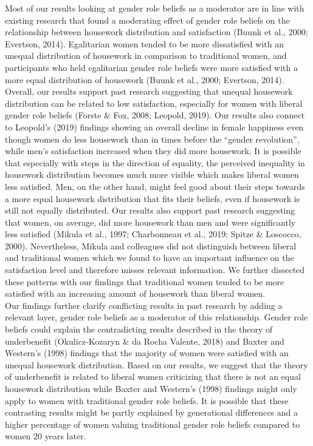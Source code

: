 \documentclass[
  man,floatsintext]{apa6}
\begin{document}
Most of our results looking at gender role beliefs as a moderator are in line with existing research that found a moderating effect of gender role beliefs on the relationship between housework distribution and satisfaction (Buunk et al., 2000; Evertson, 2014). Egalitarian women tended to be more dissatisfied with an unequal distribution of housework in comparison to traditional women, and participants who held egalitarian gender role beliefs were more satisfied with a more equal distribution of housework (Buunk et al., 2000; Evertson, 2014). Overall, our results support past research suggesting that unequal housework distribution can be related to low satisfaction, especially for women with liberal gender role beliefs (Forste \& Fox, 2008; Leopold, 2019). Our results also connect to Leopold's (2019) findings showing an overall decline in female happiness even though women do less housework than in times before the ``gender revolution'', while men's satisfaction increased when they did more housework. It is possible that especially with steps in the direction of equality, the perceived inequality in housework distribution becomes much more visible which makes liberal women less satisfied. Men, on the other hand, might feel good about their steps towards a more equal housework distribution that fits their beliefs, even if housework is still not equally distributed.
Our results also support past research suggesting that women, on average, did more housework than men and were significantly less satisfied (Mikula et al., 1997; Charbonneau et al., 2019; Spitze \& Loscocco, 2000). Nevertheless, Mikula and colleagues did not distinguish between liberal and traditional women which we found to have an important influence on the satisfaction level and therefore misses relevant information. We further dissected these patterns with our findings that traditional women tended to be more satisfied with an increasing amount of housework than liberal women.\\
Our findings further clarify conflicting results in past research by adding a relevant layer, gender role beliefs as a moderator of this relationship. Gender role beliefs could explain the contradicting results described in the theory of underbenefit (Okulicz-Kozaryn \& da Rocha Valente, 2018) and Baxter and Western's (1998) findings that the majority of women were satisfied with an unequal housework distribution. Based on our results, we suggest that the theory of underbenefit is related to liberal women criticizing that there is not an equal housework distribution while Baxter and Western's (1998) findings might only apply to women with traditional gender role beliefs. It is possible that these contrasting results might be partly explained by generational differences and a higher percentage of women valuing traditional gender role beliefs compared to women 20 years later.
\end{document}
